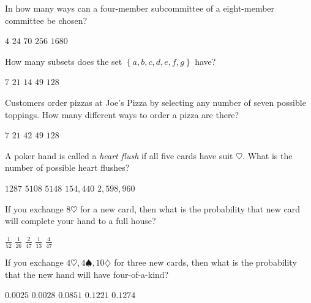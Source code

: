 \documentclass[answers,12pt]{exam}
\begin{document}
\begin{questions}
\question In how many ways can a four-member subcommittee
of a eight-member committee be chosen?\\
\begin{oneparchoices}
\choice $4$ %
\choice $24$ %
\correctchoice $70$
\choice $256$ %
\choice $1680$ %
\end{oneparchoices}

\question How many subsets does the set
$\left\{a,b,c,d,e,f,g\right\}$ have?\\
\begin{oneparchoices}
\choice $7$ %
\choice $21$ %
\choice $14$ %
\choice $49$ %
\correctchoice $128$
\end{oneparchoices}

\question Customers order pizzas at Joe's Pizza
by selecting any number of seven possible toppings.
How many different ways to order a pizza are there?\\
\begin{oneparchoices}
\choice $7$ %
\choice $21$ %
\choice $42$ %
\choice $49$ %
\correctchoice $128$
\end{oneparchoices}

\question A poker hand is called a {\em heart flush}
if all five cards have suit $\heartsuit$. What is
the number of possible heart flushes?\\
\begin{oneparchoices}
\correctchoice $1287$
\choice $5108$ %
\choice $5148$ %
\choice $154,440$ %
\choice $2,598,960$ %
\end{oneparchoices}


\question\label{FirstPoker} 
If you exchange $8\heartsuit$ for a new card,
then what is the probability that new card
will complete your hand to a full house?\\
\begin{oneparchoices}
\choice $\frac{1}{52}$
\choice $\frac{1}{26}$ %
\choice $\frac{2}{47}$ %
\choice $\frac{1}{13}$ %
\correctchoice $\frac{4}{47}$
\end{oneparchoices}

\question\label{LastPoker}
If you exchange $4\heartsuit,4\spadesuit,10\diamondsuit$ for three
new cards, then what is the probability that the new hand
will have four-of-a-kind?\\
\begin{oneparchoices}
\choice $0.0025$ %
\correctchoice $0.0028$
\choice $0.0851$ %
\choice $0.1221$ %
\choice $0.1274$ %
\end{oneparchoices}


\end{questions}
\end{document}
